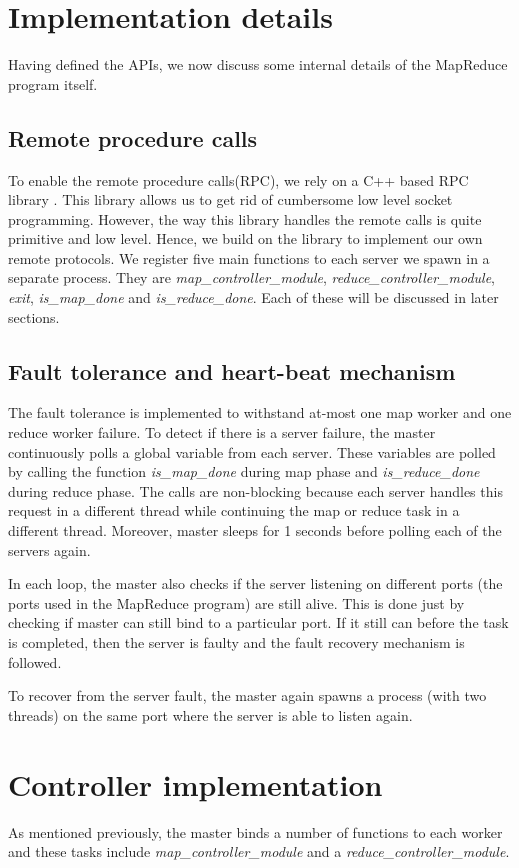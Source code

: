 \documentclass[conference, a4paper]{IEEEtran_ID}
\begin{document}
\section{Implementation details}
Having defined the APIs, we now discuss some internal details of the MapReduce program itself.

\subsection{Remote procedure calls}
To enable the remote procedure calls(RPC), we rely on a C++ based RPC library \cite{rpc}. This library allows us to get rid of cumbersome low level socket programming. However, the way this library handles the remote calls is quite primitive and low level. Hence, we build on the library to implement our own remote protocols. We register five main functions to each server we spawn in a separate process. They are \textit{map\_controller\_module}, \textit{reduce\_controller\_module}, \textit{exit}, \textit{is\_map\_done} and \textit{is\_reduce\_done}. Each of these will be discussed in later sections.

\subsection{Fault tolerance and heart-beat mechanism}
The fault tolerance is implemented to withstand at-most one map worker and one reduce worker failure. To detect if there is a server failure, the master continuously polls a global variable from each server. These variables are polled by calling the function \textit{is\_map\_done} during map phase and \textit{is\_reduce\_done} during reduce phase. The calls are non-blocking because each server handles this request in a different thread while continuing the map or reduce task in a different thread. Moreover, master sleeps for 1 seconds before polling each of the servers again.

In each loop, the master also checks if the server listening on different ports (the ports used in the MapReduce program) are still alive. This is done just by checking if master can still bind to a particular port. If it still can before the task is completed, then the server is faulty and the fault recovery mechanism is followed.

To recover from the server fault, the master again spawns a process (with two threads) on the same port where the server is able to listen again.

\section{Controller implementation}
As mentioned previously, the master binds a number of functions to each worker and these tasks include \textit{map\_controller\_module} and a \textit{reduce\_controller\_module}. 
\end{document}
